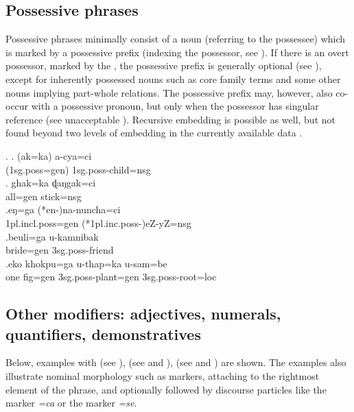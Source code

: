 \subsection{Possessive phrases}\label{str-np-poss}

Possessive phrases minimally consist  of a noun (referring to the possessee) which is marked by a possessive prefix (indexing the possessor, see \Next[a]). If there is an overt possessor, marked by the , the possessive prefix is generally optional (see \Next[b]), except for inherently possessed nouns such as core family terms and some other nouns implying part-whole relations. The possessive prefix may, however, also  co-occur with a possessive pronoun, but only when the possessor has singular reference (see unacceptable \Next[c]). Recursive embedding is possible as well, but not found beyond two levels of embedding in the currently available data \Next[e].\largerpage

\ex. \ag. (ak=ka)        a-cya=ci\\
({\sc 1sg.poss=gen}) {\sc 1sg.poss-}child{\sc =nsg}\\
 
\bg. ghak=ka    ɖaŋgak=ci\\
all{\sc =gen} stick{\sc =nsg}\\
 
\bg.eŋ=ga              (*en-)na-nuncha=ci\\
{\sc 1pl.incl.poss=gen} (*{\sc 1pl.inc.poss-})eZ-yZ{\sc =nsg}\\
 
\bg.beuli=ga    u-kamnibak\\ 
bride{\sc =gen} {\sc 3sg.poss-}friend\\
\bg.eko khokpu=ga      u-thap=ka              u-sam=be\\
one fig{\sc =gen} {\sc 3sg.poss-}plant{\sc =gen} {\sc 3sg.poss-}root{\sc =loc}\\
 

\subsection{Other modifiers: adjectives, numerals, quantifiers, demonstratives}\label{str-np-mod}

Below, examples with  (see \Next[a]),  (see \Next[b] and \Next[c]),  (see \Next[d] and \Next[e]) are shown. The examples also illustrate nominal morphology such as  markers, attaching to the rightmost element of the phrase, and optionally followed by discourse particles like the  marker \emph{=ca} or the  marker \emph{=se}.

